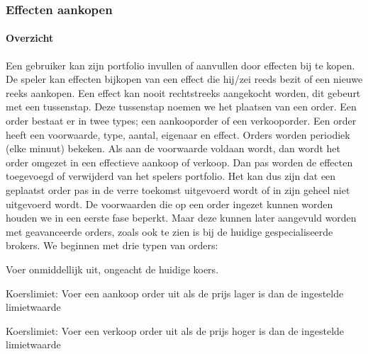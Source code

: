 \subsubsection{Effecten aankopen}
\begin{compact}

\paragraph{Overzicht}Een gebruiker kan zijn portfolio invullen of aanvullen door effecten bij te kopen. De speler kan effecten bijkopen van een effect die hij/zei reeds bezit of een nieuwe reeks aankopen. Een effect kan nooit rechtstreeks aangekocht worden, dit gebeurt met een tussenstap. Deze tussenstap noemen we het plaatsen van een order. Een order bestaat er in twee types; een aankooporder of een verkooporder. Een order heeft een voorwaarde, type, aantal, eigenaar en effect. Orders worden periodiek (elke minuut) bekeken. Als aan de voorwaarde voldaan wordt, dan wordt het order omgezet in een effectieve aankoop of verkoop. Dan pas worden de effecten toegevoegd of verwijderd van het spelers portfolio. Het kan dus zijn dat een geplaatst order pas in de verre toekomst uitgevoerd wordt of in zijn geheel niet uitgevoerd wordt. De voorwaarden die op een order ingezet kunnen worden houden we in een eerste fase beperkt. Maar deze kunnen later aangevuld worden met geavanceerde orders, zoals ook te zien is bij de huidige gespecialiseerde brokers. We beginnen met drie typen van orders:

\begin{itemize_compact}
 \item Voer onmiddellijk uit, ongeacht de huidige koers.
 \item Koerslimiet: Voer een aankoop order uit als de prijs lager is dan de ingestelde limietwaarde
 \item Koerslimiet: Voer een verkoop order uit als de prijs hoger is dan de ingestelde limietwaarde
\end{itemize_compact}


\end{compact}
